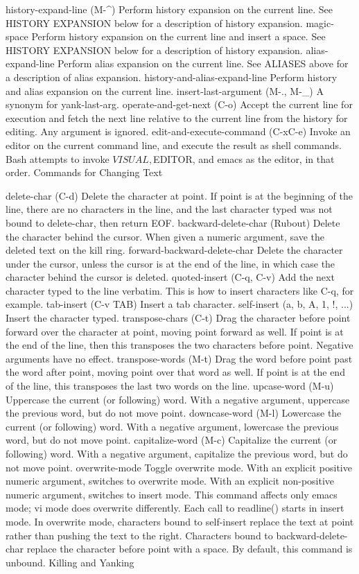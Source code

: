 \documentclass[11pt]{article}
\begin{document}
{{{history-expand-line (M-^)
Perform history expansion on the current line. See HISTORY EXPANSION below for a description of history expansion.
magic-space
Perform history expansion on the current line and insert a space. See HISTORY EXPANSION below for a description of history expansion.
alias-expand-line
Perform alias expansion on the current line. See ALIASES above for a description of alias expansion.
history-and-alias-expand-line
Perform history and alias expansion on the current line.
insert-last-argument (M-., M-_)
A synonym for yank-last-arg.
operate-and-get-next (C-o)
Accept the current line for execution and fetch the next line relative to the current line from the history for editing. Any argument is ignored.
edit-and-execute-command (C-xC-e)
Invoke an editor on the current command line, and execute the result as shell commands. Bash attempts to invoke $VISUAL, $EDITOR, and emacs as the editor, in that order.
Commands for Changing Text

delete-char (C-d)
Delete the character at point. If point is at the beginning of the line, there are no characters in the line, and the last character typed was not bound to delete-char, then return EOF.
backward-delete-char (Rubout)
Delete the character behind the cursor. When given a numeric argument, save the deleted text on the kill ring.
forward-backward-delete-char
Delete the character under the cursor, unless the cursor is at the end of the line, in which case the character behind the cursor is deleted.
quoted-insert (C-q, C-v)
Add the next character typed to the line verbatim. This is how to insert characters like C-q, for example.
tab-insert (C-v TAB)
Insert a tab character.
self-insert (a, b, A, 1, !, ...)
Insert the character typed.
transpose-chars (C-t)
Drag the character before point forward over the character at point, moving point forward as well. If point is at the end of the line, then this transposes the two characters before point. Negative arguments have no effect.
transpose-words (M-t)
Drag the word before point past the word after point, moving point over that word as well. If point is at the end of the line, this transposes the last two words on the line.
upcase-word (M-u)
Uppercase the current (or following) word. With a negative argument, uppercase the previous word, but do not move point.
downcase-word (M-l)
Lowercase the current (or following) word. With a negative argument, lowercase the previous word, but do not move point.
capitalize-word (M-c)
Capitalize the current (or following) word. With a negative argument, capitalize the previous word, but do not move point.
overwrite-mode
Toggle overwrite mode. With an explicit positive numeric argument, switches to overwrite mode. With an explicit non-positive numeric argument, switches to insert mode. This command affects only emacs mode; vi mode does overwrite differently. Each call to readline() starts in insert mode. In overwrite mode, characters bound to self-insert replace the text at point rather than pushing the text to the right. Characters bound to backward-delete-char replace the character before point with a space. By default, this command is unbound.
Killing and Yanking

}}}
\end{document}
